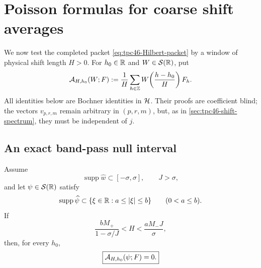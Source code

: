 \section{Poisson formulas for coarse shift averages}
\label{sec:tpc46-poisson-averages}

We now test the completed packet
\eqref{eq:tpc46-Hilbert-packet} by a window of physical shift
length \(H>0\).  For \(h_0\in\mathbb R\) and
\(W\in\mathcal S(\mathbb R)\), put
\begin{equation}
 \mathcal A_{H,h_0}(W;F)
 :=\frac1H\sum_{h\in\mathbb Z}
 W\!\left(\frac{h-h_0}{H}\right)F_h.
 \label{eq:tpc46-normalized-shift-average}
\end{equation}
All identities below are Bochner identities in \(\mathcal H\).  Their proofs
are coefficient blind; the vectors \(v_{p,r,m}\) remain arbitrary in
\((p,r,m)\), but, as in \cref{sec:tpc46-shift-spectrum}, they must be
independent of \(j\).

\subsection{An exact band-pass null interval}

\begin{theorem}
\label{thm:tpc46-exact-bandpass-vanishing}
Assume
\begin{equation}
 \operatorname{supp}\widehat w\subset[-\sigma,\sigma],
 \qquad J>\sigma,
 \label{eq:tpc46-bandpass-orbit-support}
\end{equation}
and let \(\psi\in\mathcal S(\mathbb R)\) satisfy
\begin{equation}
 \operatorname{supp}\widehat\psi
 \subset\{\xi\in\mathbb R:a\le|\xi|\le b\}
 \qquad(0<a\le b).
 \label{eq:tpc46-bandpass-window-support}
\end{equation}
If
\begin{equation}
 \boxed{
 \frac{bM_+}{1-\sigma/J}<H<\frac{aM_-J}{\sigma},}
 \label{eq:tpc46-exact-bandpass-H-range}
\end{equation}
then, for every \(h_0\),
\begin{equation}
 \boxed{\mathcal A_{H,h_0}(\psi;F)=0.}
 \label{eq:tpc46-exact-bandpass-average-zero}
\end{equation}
\end{theorem}

